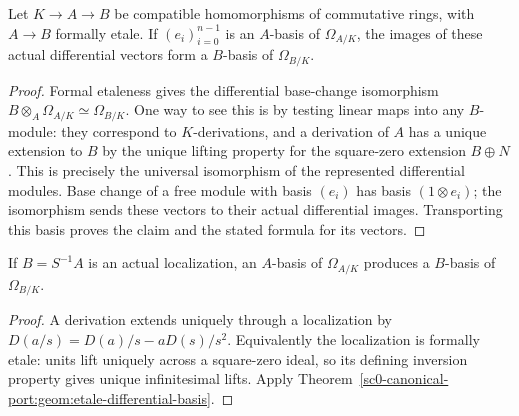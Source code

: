 \begin{theorem}
\label{sc0-canonical-port:geom:etale-differential-basis}
\leanok
Let \(K\to A\to B\) be compatible homomorphisms of commutative
rings, with \(A\to B\) formally etale. If \((e_i)_{i=0}^{n-1}\)
is an \(A\)-basis of \(\Omega_{A/K}\), the images of these
actual differential vectors form a \(B\)-basis of
\(\Omega_{B/K}\).
\end{theorem}
\begin{proof}
Formal etaleness gives the differential base-change isomorphism
\(B\otimes_A\Omega_{A/K}\simeq\Omega_{B/K}\).
One way to see this is by testing linear maps into any \(B\)-module:
they correspond to \(K\)-derivations, and a derivation of \(A\)
has a unique extension to \(B\) by the unique lifting property
for the square-zero extension \(B\oplus N\). This is precisely
the universal isomorphism of the represented differential modules.
Base change of a free module with basis \((e_i)\) has basis
\((1\otimes e_i)\); the isomorphism sends these vectors to their
actual differential images. Transporting this basis proves the
claim and the stated formula for its vectors.
\end{proof}

\begin{corollary}
\label{sc0-canonical-port:geom:localization-differential-basis}
\leanok
If \(B=S^{-1}A\) is an actual localization, an \(A\)-basis of
\(\Omega_{A/K}\) produces a \(B\)-basis of \(\Omega_{B/K}\).
\end{corollary}
\begin{proof}
A derivation extends uniquely through a localization by
\(D(a/s)=D(a)/s-aD(s)/s^2\). Equivalently the localization is
formally etale: units lift uniquely across a square-zero ideal,
so its defining inversion property gives unique infinitesimal lifts.
Apply Theorem~\ref{sc0-canonical-port:geom:etale-differential-basis}.
\end{proof}

